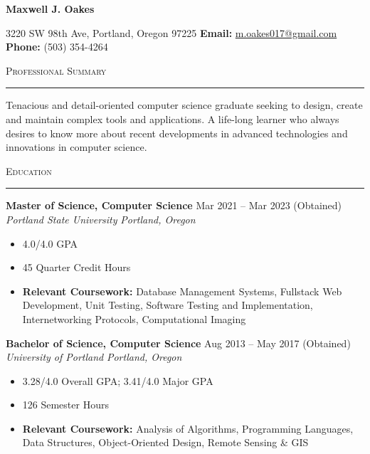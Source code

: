 \documentclass[11pt]{article}
\makeatletter
\def\name{Maxwell J. Oakes}
\def\addr{3220 SW 98th Ave, Portland, Oregon 97225}
\def\email{\href{mailto:m.oakes017@gmail.com}
    {m.oakes017@gmail.com}}
\def\phone{(503) 354-4264}
\newcommand{\header}[1]{
    \begin{Center}
        \LARGE
        \textbf{#1}
        \newline
        \normalsize
        \toplistspacing
        \addr
        \newline
        \textbf{Email:} \email
        \newline
        \textbf{Phone:} \phone
    \end{Center}
    \vspace{-0.12in}
}
\newcommand{\sectiontitle}[1]{
    \noindent\Large\textsc{#1}
    \newline
    \vspace{-0.18in}
    \hrule   
}
\newcommand{\plainparagraph}[1]{
    \topitemspacing
    \noindent\normalsize#1
}
\newcommand{\school}[4]{
    \topitemspacing
    \normalsize\noindent\textbf{#1}
    \hfill
    \noindent#3
    \newline
    \noindent\textit{#2}
    \hfill
    \noindent\textit{#4}
    \toplistspacing
}
\newcommand{\sectionendspace}{
    \vspace{0.1in}
}
\newcommand{\toplistspacing}{
    \vspace{0.04in}
}
\newcommand{\topitemspacing}{
    \vspace{0.1in}
}
\makeatother
\begin{document}
    \header{\name}
    \sectiontitle{Professional Summary}
    \plainparagraph{Tenacious and detail-oriented computer science graduate seeking to design, create and maintain complex tools and applications. A life-long learner who always desires to know more about recent developments in advanced technologies and innovations in computer science.}
    \sectionendspace

    \sectiontitle{Education}
    \school{Master of Science, Computer Science}
    {Portland State University}
    {Mar 2021 -- Mar 2023 (Obtained)}
    {Portland, Oregon}
    \begin{itemize}[noitemsep,nolistsep]
        \item 4.0/4.0 GPA
        \item 45 Quarter Credit Hours
        \item \textbf{Relevant Coursework:} Database Management Systems, Fullstack Web Development, Unit Testing, Software Testing and Implementation, Internetworking Protocols, Computational Imaging
    \end{itemize}
    \school{Bachelor of Science, Computer Science}
    {University of Portland}
    {Aug 2013 -- May 2017 (Obtained)}
    {Portland, Oregon}
    \begin{itemize}[noitemsep,nolistsep]
        \item 3.28/4.0 Overall GPA; 3.41/4.0 Major GPA
        \item 126 Semester Hours
        \item \textbf{Relevant Coursework:} Analysis of Algorithms, Programming Languages, Data Structures, Object-Oriented Design, Remote Sensing \& GIS
    \end{itemize}
    \sectionendspace
\end{document}
